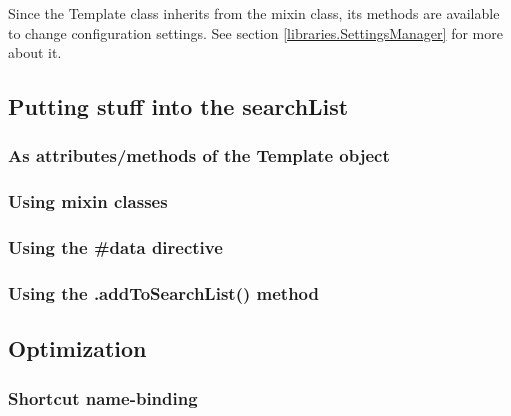 Since the Template class inherits from the  mixin class,
its methods are available to change configuration settings.  See section
\ref{libraries.SettingsManager} for more about it.


\subsection{Putting stuff into the searchList}
\label{puttingItTogether.searchList}

\subsubsection{As attributes/methods of the Template object}
\label{puttingItTogether.searchList.self}

\subsubsection{Using mixin classes}
\label{puttingItTogether.searchList.self}

\subsubsection{Using the \#data directive}
\label{puttingItTogether.searchList.dataDirective}

\subsubsection{Using the .addToSearchList() method}
\label{puttingItTogether.searchList.addToSearchList}


\subsection{Optimization}
\label{puttingItTogether.optimization}


\subsubsection{Shortcut name-binding}
\label{puttingItTogether.optimization.namebinding}

